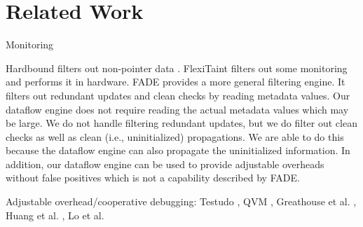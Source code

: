 \section{Related Work}
\label{sec:related}

Monitoring

Hardbound filters out non-pointer data \cite{hardbound-asplos08}. FlexiTaint filters out some monitoring
and performs it in hardware. FADE provides a more general filtering engine. It
filters out redundant updates and clean checks by reading metadata values. Our
dataflow engine does not require reading the actual metadata values which may
be large. We do not handle filtering redundant updates, but we do filter out
clean checks as well as clean (i.e., uninitialized) propagations. We are able
to do this because the dataflow engine can also propagate the uninitialized
information. In addition, our dataflow engine can be used to provide adjustable
overheads without false positives which is not a capability described by FADE.

Adjustable overhead/cooperative debugging: Testudo \cite{testudo-micro08}, QVM
\cite{qvm-oopsla08}, Greathouse et al. \cite{greathouse-cgo11}, Huang et al.
\cite{huang-sttt12}, Lo et al. \cite{lo-rtas14}
